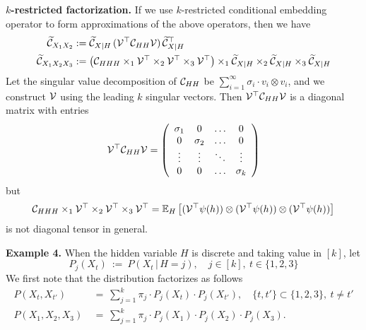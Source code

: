 \documentclass[11pt]{article}
\begin{document}
{\bf $k$-restricted factorization.} If we use $k$-restricted conditional embedding operator to form approximations of the above operators, then we have 
\begin{align}
  \widetilde {\mathcal{C}}_{X_1X_2} &:= \widetilde {\mathcal{C}}_{X|H}\, (\mathcal{V}^\top \mathcal{C}_{HH} \mathcal{V})\, \widetilde {\mathcal{C}}_{X|H}^\top \\ 
  \widetilde {\mathcal{C}}_{X_1X_2X_3} &:= \left(\mathcal{C}_{HHH} \times_1 \mathcal{V}^\top \times_2 \mathcal{V}^\top \times_3 \mathcal{V}^\top\right) \times_1 \widetilde {\mathcal{C}}_{X|H} \times_2 \widetilde {\mathcal{C}}_{X|H} \times_3 \widetilde {\mathcal{C}}_{X|H}
\end{align}
Let the singular value decomposition of $\mathcal{C}_{HH}$ be $\sum_{i=1}^{\infty} \sigma_i \cdot v_i \otimes v_i$, and we construct $\mathcal{V}$ using the leading $k$ singular vectors. Then $\mathcal{V}^\top \mathcal{C}_{HH} \mathcal{V}$ is a diagonal matrix with entries
\begin{align}
 \mathcal{V}^\top \mathcal{C}_{HH} \mathcal{V} = \left(	
  \begin{array}{cccc}
    \sigma_1 & 0 & \ldots & 0 \cr
    0 & \sigma_2 & \ldots & 0 \cr
    \vdots & \vdots & \ddots & \vdots \cr
    0 & 0 & \ldots & \sigma_k
  \end{array}
 \right)
\end{align}
but  
\begin{align}
 \mathcal{C}_{HHH} \times_1 \mathcal{V}^\top \times_2 \mathcal{V}^\top \times_3 \mathcal{V}^\top = \mathbb{E}_{H} \left[ (\mathcal{V}^\top \psi(h)) \otimes (\mathcal{V}^\top \psi(h)) \otimes (\mathcal{V}^\top \psi(h))\right]   
\end{align}
is not diagonal tensor in general. 

{\bf Example 4.} When the hidden variable $H$ is discrete and taking value in $[k]$, let
\[
 P_j(X_t) \ :=\ P(X_t\, |\, H = j),\quad j \in [k],\ t \in \{1,2,3\}
\]
We first note that the distribution factorizes as follows
\begin{align}
P( X_t, X_{t'} )
\ & =\ \sum_{j=1}^k \pi_j \cdot P_j(X_t) \cdot P_j(X_{t'}),
\quad \{t,t'\} \subset \{1,2,3\} ,\ t \neq t' \label{eq:joint2} \\
P(X_1, X_2, X_3)
\ & =\ \sum_{j=1}^k \pi_j \cdot P_j(X_1) \cdot P_j(X_2) \cdot P_j(X_3). \label{eq:joint3}
\end{align}
\end{document}
